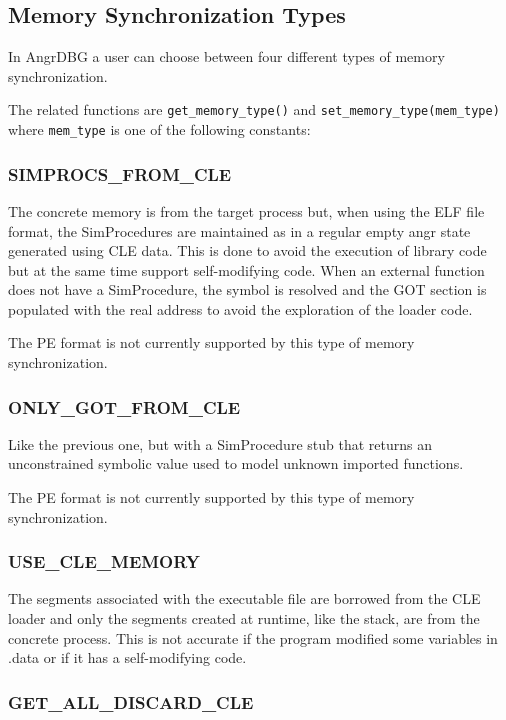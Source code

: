 \subsection{Memory Synchronization Types}
\label{angrdbg_memtypes}

In AngrDBG a user can choose between four different types of memory synchronization.

The related functions are \verb|get_memory_type()| and \verb|set_memory_type(mem_type)| where \verb|mem_type| is one of the following constants:

\subsubsection{SIMPROCS\_FROM\_CLE}

The concrete memory is from the target process but, when using the ELF file format, the SimProcedures are maintained as in a regular empty angr state generated using CLE data. This is done to avoid the execution of library code but at the same time support self-modifying code. When an external function does not have a SimProcedure, the symbol is resolved and the GOT section is populated with the real address to avoid the exploration of the loader code.

The PE format is not currently supported by this type of memory synchronization.

\subsubsection{ONLY\_GOT\_FROM\_CLE}

Like the previous one, but with a SimProcedure stub that returns an unconstrained symbolic value used to model unknown imported functions.

The PE format is not currently supported by this type of memory synchronization.

\subsubsection{USE\_CLE\_MEMORY}

The segments associated with the executable file are borrowed from the CLE loader and only the segments created at runtime, like the stack, are from the concrete process. This is not accurate if the program modified some variables in .data or if it has a self-modifying code.

\subsubsection{GET\_ALL\_DISCARD\_CLE}

